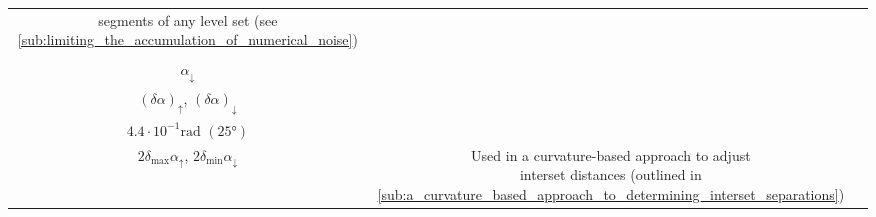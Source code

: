 \begin{table}[htpb]
\begin{tabular}{ccc}
{        segments of any level set (see
        \cref{sub:limiting_the_accumulation_of_numerical_noise})}
        \\[9pt]
        \makecell[c]{$\alpha_{\uparrow}$\\ $\alpha_{\downarrow}$ \\[1.5pt]%
        ${(\delta\alpha)}_{\uparrow}$, ${(\delta\alpha)}_{\downarrow}$} &
        \makecell[c]{$8.7\cdot10^{-2}\si{\radian}$ \phantom{2}$(5\si{\degree})$\\ %
            $4.4\cdot10^{-1}\si{\radian}$ $(25\si{\degree})$\\[1.5pt]%
        $2\delta_{\max}\alpha_{\uparrow}$, $2\delta_{\min}\alpha_{\downarrow}$}%
        & \makecell[c]{Used in a curvature-based approach to adjust\\
        interset distances (outlined in
        \cref{sub:a_curvature_based_approach_to_determining_interset_separations})}
        \\[18pt]
        \bottomrule
    \end{tabular}
\end{table}

